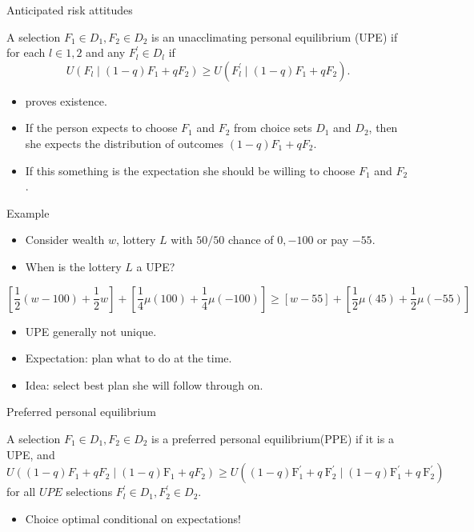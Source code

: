 \documentclass[11pt, aspectratio=169]{beamer}
\begin{document}
\begin{frame}{Anticipated risk attitudes}
     \begin{definition}[UPE]
        A selection $F_1 \in D_1, F_2 \in D_2$ is an unacclimating personal equilibrium (UPE) if for each $l \in 1,2$
        and any $F_l^{\prime} \in D_l$ if
        \[U\left(F_l \mid(1-q) F_1+q F_2\right) \geq U\left(F_l^{\prime} \mid(1-q) F_1+ q F_2\right).\]
    \end{definition}

    \begin{itemize}
    \item  \citet{Koszegi2010}  proves existence.\medskip
        \item  If the person expects to choose $F_1$ and $F_2$ from choice sets $D_1$ and $D_2$, then she expects the distribution of outcomes $(1-q) F_1+q F_2$.\medskip
        \item If this something is the expectation she should be willing to choose  $F_1$ and $F_2$.\medskip
    \end{itemize}
\end{frame}


\begin{frame}{Example}
\begin{itemize}
\item Consider wealth $w$, lottery $L$ with $50/50$ chance of $0,-100$ or pay $-55$.\medskip
\item When is the lottery $L$ a UPE?\medskip
\end{itemize}
\[
\left[\frac{1}{2}(w -100)+\frac{1}{2} w\right]
 +\left[\frac{1}{4} \mu(100)+\frac{1}{4} \mu(-100)\right]
\geq  {[w-55] } + \left[\frac{1}{2} \mu(45)+\frac{1}{2} \mu(-55)\right]
\]
    \begin{itemize}
        \item UPE generally not unique.\medskip
        \item Expectation: plan what to do at the time.\medskip
        \item Idea: select best plan she will follow through on.\medskip
    \end{itemize}
\end{frame}

\begin{frame}{Preferred personal equilibrium }
    \begin{definition}[PPE]
        A selection $F_1 \in D_1, F_2 \in D_2$ is a preferred personal equilibrium(PPE) if it is a UPE,
        and \[U\left((1-q) F_1+q F_2 \mid(1-q) \mathrm{F}_1+qF_2\right) \geq U\left((1-q) \mathrm{F}_1^{\prime}+q \mathrm{~F}_2^{\prime} \mid(1-q) \mathrm{F}_1^{\prime}+q \mathrm{~F}_2^{\prime}\right)\]
        for all $U P E$ selections $F_l^{\prime} \in D_1, F_2^{\prime} \in D_2$.\\
    \end{definition}
\begin{itemize}
\item Choice optimal \alert{conditional on} expectations!
\end{itemize}
\end{frame}
\end{document}
